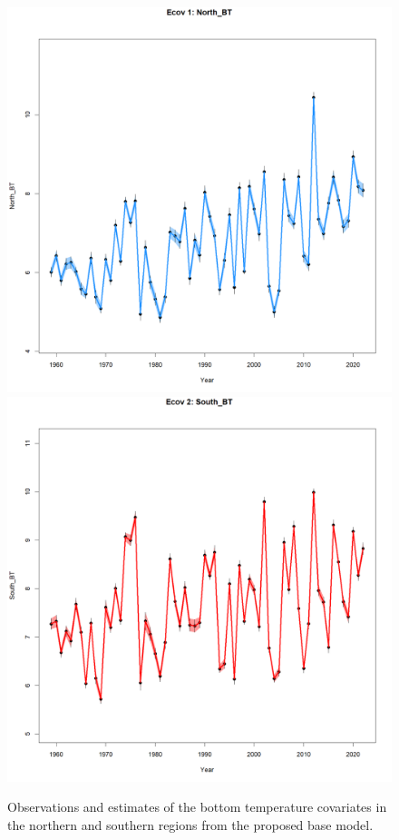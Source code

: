 \documentclass[
]{article}
\begin{document}
\begin{figure}

{\centering \includegraphics[width=0.65\linewidth]{../2023.RT.Runs/Run34/plots_png/results/Ecov_1_North_BT} \includegraphics[width=0.65\linewidth]{../2023.RT.Runs/Run34/plots_png/results/Ecov_2_South_BT} 

}

\caption{Observations and estimates of the bottom temperature covariates in the northern and southern regions from the proposed base model.}\label{fig:bottom-temp}
\end{figure}
\end{document}
